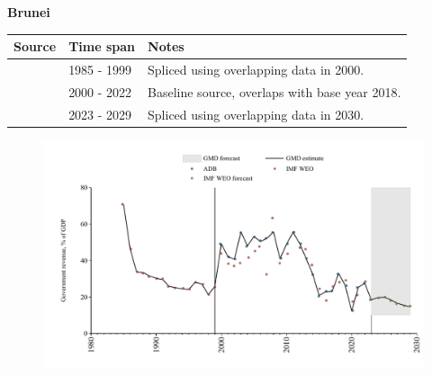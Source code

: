 \documentclass[12pt,a4paper,landscape]{article}
\begin{document}
\begin{adjustbox}{max totalsize={\paperwidth}{\paperheight},center}
\begin{minipage}[t][\textheight][t]{\textwidth}
\vspace*{0.5cm}
{}
\begin{center}
{\Large\bfseries Brunei}
\end{center}
\vspace{0.5cm}
\begin{table}[H]
\centering
\small
\begin{tabular}{|l|l|l|}
\hline
\textbf{Source} & \textbf{Time span} & \textbf{Notes} \\
\hline
\rowcolor{white}\cite{IMF_WEO}& 1985 - 1999 &Spliced using overlapping data in 2000.\\
\rowcolor{lightgray}\cite{ADB}& 2000 - 2022 &Baseline source, overlaps with base year 2018.\\
\rowcolor{white}\cite{IMF_WEO_forecast}& 2023 - 2029 &Spliced using overlapping data in 2030.\\
\hline
\end{tabular}
\end{table}
\begin{figure}[H]
\centering
\includegraphics[width=\textwidth,height=0.6\textheight,keepaspectratio]{graphs/BRN_govrev_GDP.pdf}
\end{figure}
\end{minipage}
\end{adjustbox}
\end{document}
